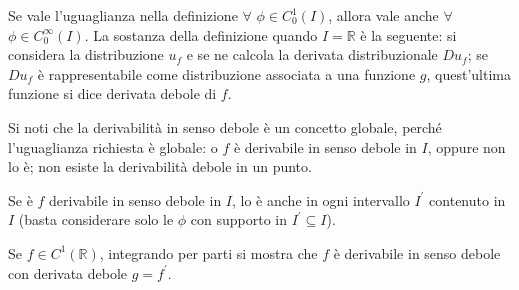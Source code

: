 \documentclass{article}
\begin{document}
Se vale l'uguaglianza nella definizione $\forall $ $\phi \in C_{0}^{1}\left(
I\right) $, allora vale anche $\forall $ $\phi \in C_{0}^{\infty }\left(
I\right) $. La sostanza della definizione quando $I=%
\mathbb{R}
$ \`{e} la seguente: si considera la distribuzione $u_{f}$ e se ne calcola
la derivata distribuzionale $Du_{f}$; se $Du_{f}$ \`{e} rappresentabile come
distribuzione associata a una funzione $g$, quest'ultima funzione si dice
derivata debole di $f$.

Si noti che la derivabilit\`{a} in senso debole \`{e} un concetto globale,
perch\'{e} l'uguaglianza richiesta \`{e} globale: o $f$ \`{e} derivabile in
senso debole in $I$, oppure non lo \`{e}; non esiste la derivabilit\`{a}
debole in un punto.

Se \`{e} $f$ derivabile in senso debole in $I$, lo \`{e} anche in ogni
intervallo $I^{\prime }$ contenuto in $I$ (basta considerare solo le $\phi $
con supporto in $I^{\prime }\subseteq I$).

Se $f\in C^{1}\left( 
\mathbb{R}
\right) $, integrando per parti si mostra che $f$ \`{e} derivabile in senso
debole con derivata debole $g=f^{\prime }$.
\end{document}
